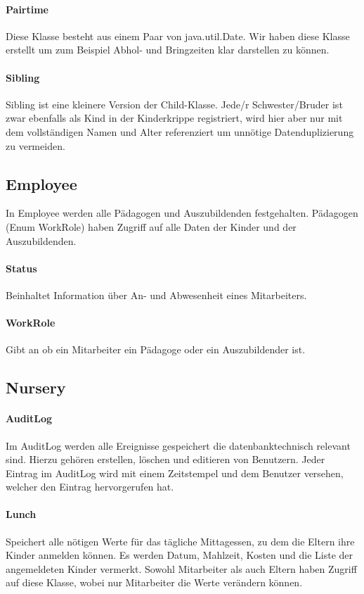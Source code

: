 \paragraph{Pairtime}
	Diese Klasse besteht aus einem Paar von java.util.Date. Wir haben diese Klasse erstellt um zum Beispiel Abhol- und Bringzeiten klar darstellen zu können. 
\paragraph{Sibling}
	Sibling ist eine kleinere Version der Child-Klasse. Jede/r Schwester/Bruder ist zwar ebenfalls als Kind in der Kinderkrippe registriert, wird hier aber nur mit dem vollständigen Namen und Alter referenziert um unnötige Datenduplizierung zu vermeiden. 

\subsection{Employee}
	In Employee werden alle Pädagogen und Auszubildenden festgehalten. Pädagogen (Enum WorkRole) haben Zugriff auf alle Daten der Kinder und der Auszubildenden. 
\paragraph{Status}
	Beinhaltet Information über An- und Abwesenheit eines Mitarbeiters. 
\paragraph{WorkRole}
	Gibt an ob ein Mitarbeiter ein Pädagoge oder ein Auszubildender ist.
	
\subsection{Nursery}
\paragraph{AuditLog}
	Im AuditLog werden alle Ereignisse gespeichert die datenbanktechnisch relevant sind. Hierzu gehören erstellen, löschen und editieren von Benutzern. Jeder Eintrag im AuditLog wird mit einem Zeitstempel und dem Benutzer versehen, welcher den Eintrag hervorgerufen hat. 
\paragraph{Lunch}
	Speichert alle nötigen Werte für das tägliche Mittagessen, zu dem die Eltern ihre Kinder anmelden können. Es werden Datum, Mahlzeit, Kosten und die Liste der angemeldeten Kinder vermerkt. Sowohl Mitarbeiter als auch Eltern haben Zugriff auf diese Klasse, wobei nur Mitarbeiter die Werte verändern können.
